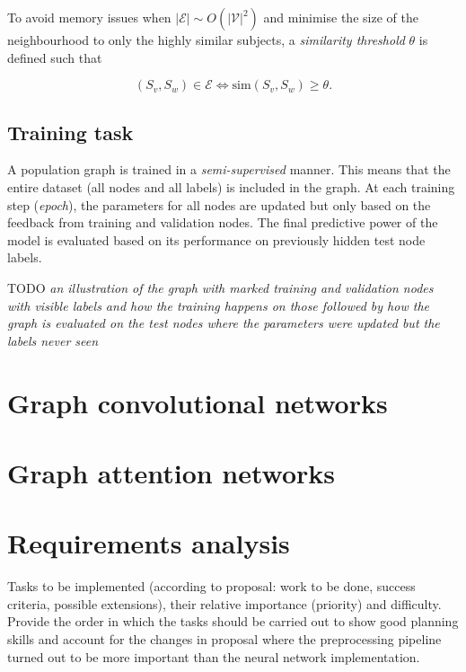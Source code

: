 To avoid memory issues when $|\mathcal{E}| \sim O(|\mathcal{V}|^2)$ and minimise the size of the neighbourhood to only the highly similar subjects, a \textit{similarity threshold} $\theta$ is defined such that

\begin{equation}
    (S_v, S_w) \in \mathcal{E} \Leftrightarrow \mathrm{sim}(S_v, S_w) \geq \theta.
\end{equation}

\subsection{Training task}

A population graph is trained in a \textit{semi-supervised} manner. This means that the entire dataset (all nodes and all labels) is included in the graph. At each training step (\textit{epoch}), the parameters for all nodes are updated but only based on the feedback from training and validation nodes. The final predictive power of the model is evaluated based on its performance on previously hidden test node labels.

TODO \textit{an illustration of the graph with marked training and validation nodes with visible labels and how the training happens on those followed by how the graph is evaluated on the test nodes where the parameters were updated but the labels never seen}



\section{Graph convolutional networks}

\section{Graph attention networks}

\section{Requirements analysis}

Tasks to be implemented (according to proposal: work to be done, success criteria, possible extensions), their relative importance (priority) and difficulty. Provide the order in which the tasks should be carried out to show good planning skills and account for the changes in proposal where the preprocessing pipeline turned out to be more important than the neural network implementation.

